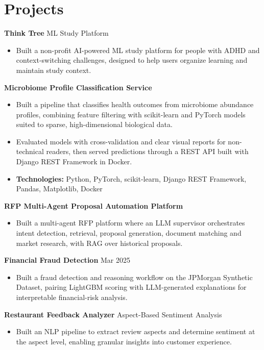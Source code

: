 \documentclass[10pt,a4paper]{article}
\begin{document}
\section{Projects}
\textbf{Think Tree} \textbar{} ML Study Platform\par
\begin{itemize}
  \item Built a non-profit AI-powered ML study platform for people with ADHD and context-switching challenges, designed to help users organize learning and maintain study context.
\end{itemize}
\textbf{Microbiome Profile Classification Service}\par
\begin{itemize}
  \item Built a pipeline that classifies health outcomes from microbiome abundance profiles, combining feature filtering with scikit-learn and PyTorch models suited to sparse, high-dimensional biological data.
  \item Evaluated models with cross-validation and clear visual reports for non-technical readers, then served predictions through a REST API built with Django REST Framework in Docker.
  \item \textbf{Technologies:} Python, PyTorch, scikit-learn, Django REST Framework, Pandas, Matplotlib, Docker
\end{itemize}
\textbf{RFP Multi-Agent Proposal Automation Platform}\par
\begin{itemize}
  \item Built a multi-agent RFP platform where an LLM supervisor orchestrates intent detection, retrieval, proposal generation, document matching and market research, with RAG over historical proposals.
\end{itemize}
\textbf{Financial Fraud Detection} \textbar{} Mar 2025\par
\begin{itemize}
  \item Built a fraud detection and reasoning workflow on the JPMorgan Synthetic Dataset, pairing LightGBM scoring with LLM-generated explanations for interpretable financial-risk analysis.
\end{itemize}
\textbf{Restaurant Feedback Analyzer} \textbar{} Aspect-Based Sentiment Analysis\par
\begin{itemize}
  \item Built an NLP pipeline to extract review aspects and determine sentiment at the aspect level, enabling granular insights into customer experience.
\end{itemize}
\end{document}
